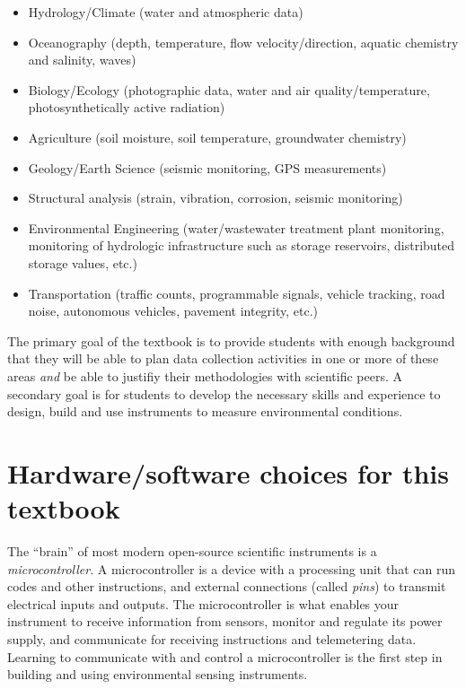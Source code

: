 \begin{itemize}
  \item Hydrology/Climate (water and atmospheric data)
  \item Oceanography (depth, temperature, flow velocity/direction, aquatic chemistry and salinity, waves)
  \item Biology/Ecology (photographic data, water and air quality/temperature, photosynthetically active radiation)
  \item Agriculture (soil moisture, soil temperature, groundwater chemistry)
  \item Geology/Earth Science (seismic monitoring, GPS measurements)
  \item Structural analysis (strain, vibration, corrosion, seismic monitoring)
  \item Environmental Engineering (water/wastewater treatment plant monitoring, monitoring of hydrologic infrastructure such as storage reservoirs, distributed storage values, etc.)
  \item Transportation (traffic counts, programmable signals, vehicle tracking, road noise, autonomous vehicles, pavement integrity, etc.)
\end{itemize}

The primary goal of the textbook is to provide students with enough background that they will be able to plan data collection activities in one or more of these areas \emph{and} be able to justifiy their methodologies with scientific peers. A secondary goal is for students to develop the necessary skills and experience to design, build and use instruments to measure environmental conditions.

\section{\color{gray} Hardware/software choices for this textbook\color{black}}

The ``brain'' of most modern open-source scientific instruments is a \emph{microcontroller}. 
A microcontroller is a device with a processing unit that can run codes and other instructions, and external connections (called \emph{pins}) to transmit electrical inputs and outputs.
The microcontroller is what enables your instrument to receive information from sensors, monitor and regulate its power supply, and communicate for receiving instructions and telemetering data.
Learning to communicate with and control a microcontroller is the first step in building and using environmental sensing instruments.

